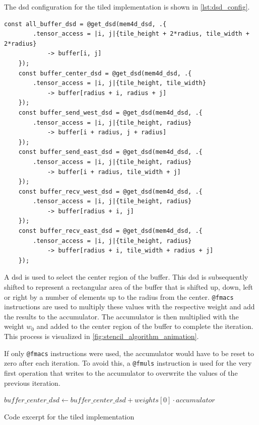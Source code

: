 The \ac{dsd} configuration for the tiled implementation is shown in \autoref{lst:dsd_config}.

\begin{lstlisting}[language=CSL, caption={DSD Configuration for Tiled Implementation}, label={lst:dsd_config}]
    const all_buffer_dsd = @get_dsd(mem4d_dsd, .{ 
        .tensor_access = |i, j|{tile_height + 2*radius, tile_width + 2*radius} 
            -> buffer[i, j] 
    });
    const buffer_center_dsd = @get_dsd(mem4d_dsd, .{ 
        .tensor_access = |i, j|{tile_height, tile_width} 
            -> buffer[radius + i, radius + j] 
    });
    const buffer_send_west_dsd = @get_dsd(mem4d_dsd, .{ 
        .tensor_access = |i, j|{tile_height, radius} 
            -> buffer[i + radius, j + radius] 
    });
    const buffer_send_east_dsd = @get_dsd(mem4d_dsd, .{ 
        .tensor_access = |i, j|{tile_height, radius} 
            -> buffer[i + radius, tile_width + j] 
    });
    const buffer_recv_west_dsd = @get_dsd(mem4d_dsd, .{ 
        .tensor_access = |i, j|{tile_height, radius} 
            -> buffer[radius + i, j] 
    });
    const buffer_recv_east_dsd = @get_dsd(mem4d_dsd, .{ 
        .tensor_access = |i, j|{tile_height, radius} 
            -> buffer[radius + i, tile_width + radius + j] 
    });    
\end{lstlisting}


A \ac{dsd} is used to select the center region of the buffer. This \ac{dsd} is subsequently shifted to represent a rectangular area of the buffer that is shifted up, down, left or right by a number of elements up to the radius from the center. \texttt{@fmacs} instructions are used to multiply these values with the respective weight and add the results to the accumulator. The accumulator is then multiplied with the weight $w_0$ and added to the center region of the buffer to complete the iteration. This process is visualized in \autoref{fig:stencil_algorithm_animation}.

If only \texttt{@fmacs} instructions were used, the accumulator would have to be reset to zero after each iteration. To avoid this, a \texttt{@fmuls} instruction is used for the very first operation that writes to the accumulator to overwrite the values of the previous iteration.

\begin{algorithm}[tbh]
    \SetAlgoLined
    $buffer\_center\_dsd \gets buffer\_center\_dsd + weights[0] \cdot accumulator$\;
    \caption{Code excerpt for the tiled implementation}\label{alg:tiled_algorithm}
\end{algorithm}


